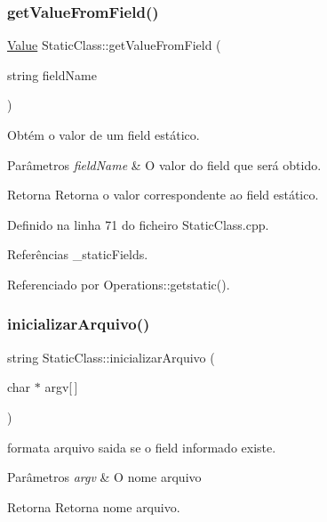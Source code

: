 \subsubsection{\texorpdfstring{get\+Value\+From\+Field()}{getValueFromField()}}
{\footnotesize\ttfamily \hyperlink{structValue}{Value} Static\+Class\+::get\+Value\+From\+Field (\begin{DoxyParamCaption}\item[{string}]{field\+Name }\end{DoxyParamCaption})}



Obtém o valor de um field estático. 


\begin{DoxyParams}{Parâmetros}
{\em field\+Name} & O valor do field que será obtido. \\
\hline
\end{DoxyParams}
\begin{DoxyReturn}{Retorna}
Retorna o valor correspondente ao field estático. 
\end{DoxyReturn}


Definido na linha 71 do ficheiro Static\+Class.\+cpp.



Referências \+\_\+static\+Fields.



Referenciado por Operations\+::getstatic().

\mbox{\label{classStaticClass_a6acf891b8d9119fddeec52169b364d66}} 
\subsubsection{\texorpdfstring{inicializar\+Arquivo()}{inicializarArquivo()}}
{\footnotesize\ttfamily string Static\+Class\+::inicializar\+Arquivo (\begin{DoxyParamCaption}\item[{char $\ast$}]{argv\mbox{[}$\,$\mbox{]} }\end{DoxyParamCaption})}



formata arquivo saida se o field informado existe. 


\begin{DoxyParams}{Parâmetros}
{\em argv} & O nome arquivo \\
\hline
\end{DoxyParams}
\begin{DoxyReturn}{Retorna}
Retorna nome arquivo. 
\end{DoxyReturn}


